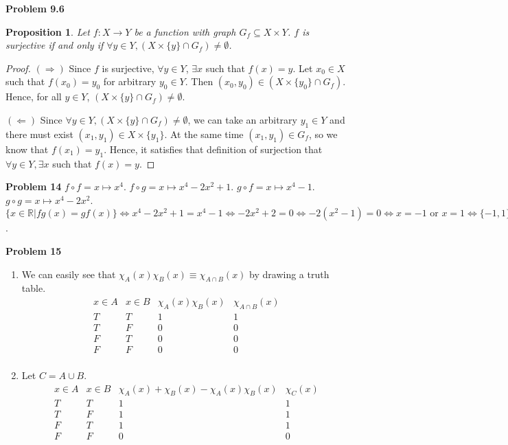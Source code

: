 \documentclass{article}
\newtheorem{prop}[thm]{Proposition}
\begin{document}
\textbf{Problem 9.6}
\begin{prop}
    Let $f:X\rightarrow Y$ be a function with graph $G_f \subseteq X\times Y$. $f$ is surjective if and only if $\forall y \in Y, (X\times \{y\}\cap G_f)\neq \emptyset$.
\end{prop}
\begin{proof}
    $(\Rightarrow)$ Since $f$ is surjective, $\forall y \in Y$, $\exists x$ such that $f(x)=y$. 
    Let $x_0 \in X$ such that $f(x_0)=y_0$ for arbitrary $y_0\in Y$.
    Then $(x_0,y_0) \in (X \times \{y_0\}\cap G_f)$. Hence, for all $y\in Y$, $(X \times \{y\}\cap G_f)\neq \emptyset$.
    
    $(\Leftarrow)$ Since $\forall y \in Y, (X\times \{y\}\cap G_f)\neq \emptyset$, we can take an arbitrary $y_1 \in Y$ and there must exist $(x_1,y_1) \in X\times \{y_1\}$.
    At the same time $(x_1,y_1)\in G_f$, so we know that $f(x_1)=y_1$. 
    Hence, it satisfies that definition of surjection that $\forall y \in Y, \exists x$ such that $f(x)=y$.
\end{proof}
\bigbreak

\textbf{Problem 14}
$f\circ f = x \mapsto x^4$. $f\circ g = x \mapsto x^4 -2x^2 + 1$. $g\circ f=x \mapsto x^4-1$. $g\circ g = x \mapsto x^4-2x^2$. \\
$\{x \in \mathbb{R}|fg(x)=gf(x)\} \Leftrightarrow x^4-2x^2+1=x^4-1 \Leftrightarrow -2x^2+2=0 \Leftrightarrow-2(x^2-1)=0\Leftrightarrow x=-1\text{ or }x=1 \Leftrightarrow \{-1,1\}$.
\bigbreak

\textbf{Problem 15}
\begin{enumerate}[label={(\roman*)}]
    \item 
    We can easily see that $\chi_A(x)\chi_B(x) \equiv \chi_{A\cap B}(x)$ by drawing a truth table.
    \begin{displaymath}
        \begin{array}{|c|c|c|c|}
        x\in A & x\in B & \chi_A(x)\chi_B(x) & \chi_{A\cap B}(x)\\ 
        \hline  
        T & T & 1 & 1 \\
        T & F & 0 & 0 \\
        F & T & 0 & 0 \\
        F & F & 0 & 0 \\
        \end{array}
    \end{displaymath}

    \item 
    Let $C = A \cup B$.
    \begin{displaymath}
        \begin{array}{|c|c|c|c|}
        x\in A & x\in B & \chi_A(x)+\chi_B(x)-\chi_A(x)\chi_B(x) & \chi_C(x)\\ 
        \hline  
        T & T & 1 & 1 \\
        T & F & 1 & 1 \\
        F & T & 1 & 1 \\
        F & F & 0 & 0 \\
        \end{array}
    \end{displaymath}
\end{enumerate}
\bigbreak
\end{document}
